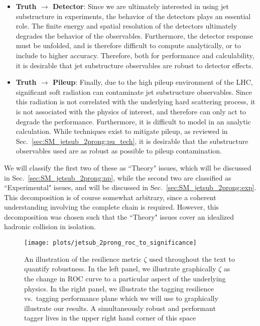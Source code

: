 \begin{itemize}
%
\item {\bf Truth $\to$ Detector}: Since we are ultimately interested in using jet substructure in experiments, the behavior of the detectors plays an essential role.
%
The finite energy and spatial resolution of the detectors ultimately degrades the behavior of the observables.
%
Furthermore, the detector response must be unfolded, and is therefore difficult to compute analytically, or to include to higher accuracy. Therefore, both for performance and calculability, it is desirable that jet substructure observables are robust to detector effects.
%
\item {\bf Truth $\to$ Pileup}: Finally, due to the high pileup environment of the LHC, significant soft radiation can contaminate jet substructure observables.
%
Since this radiation is not correlated with the underlying hard scattering process, it is not associated with the physics of interest, and therefore can only act to degrade the performance.
%
Furthermore, it is difficult to model in an analytic calculation.
%
While techniques exist to mitigate pileup, as reviewed in Sec.~\ref{sec:SM_jetsub_2prong:pu_tech}, it is desirable that the substructure observables used are as robust as possible to pileup contamination.
%
\end{itemize}
%
We will classify the first two of these as ``Theory" issues, which will be discussed in Sec.~\ref{sec:SM_jetsub_2prong:np}, while the second two are classified as ``Experimental" issues, and will be discussed in Sec.~\ref{sec:SM_jetsub_2prong:exp}. This decomposition is of course somewhat arbitrary, since a coherent understanding involving the complete chain is required. However, this decomposition was chosen such that the ``Theory" issues cover an idealized hadronic collision in isolation. 

\begin{figure}[t]
\begin{center}
\texttt{[image: plots/jetsub\_2prong\_roc\_to\_significance]}
\end{center}
\caption{An illustration of the resilience metric $\zeta$ used throughout the text to quantify robustness. In the left panel, we illustrate graphically $\zeta$ as the change in ROC curve to a particular aspect of the underlying physics. In the right panel, we illustrate the tagging resilience vs.\ tagging performance plane which we will use to graphically illustrate our results.  A simultaneously robust and performant tagger lives in the upper right hand corner of this space}
\label{fig:SM_jetsub_2prong:zeta_def}
\end{figure}


